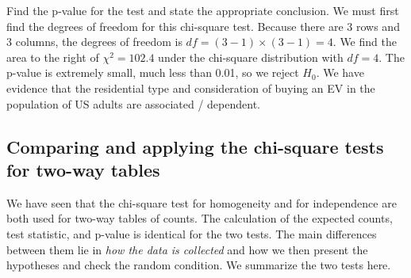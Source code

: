 \begin{examplewrap}
\begin{nexample}{Find the p-value for the test and state the appropriate conclusion.}
We must first find the degrees of freedom for this chi-square test.  Because there are 3 rows and 3 columns, the degrees of freedom is $df=(3-1)\times (3-1) = 4$. We find the area to the right of $\chi^2=102.4$ under the chi-square distribution with $df=4$.  The p-value is extremely small, much less than 0.01, so we reject $H_0$.  We have evidence that the residential type and consideration of buying an EV in the population of US adults are associated / dependent.  
\end{nexample}
\end{examplewrap}




\newpage
\subsection{Comparing and applying the chi-square tests for two-way tables}

We have seen that the chi-square test for homogeneity and for independence are both used for two-way tables of counts.  The calculation of the expected counts, test statistic, and p-value is identical for the two tests.  The main differences between them lie in \emph{how the data is collected} and how we then present the hypotheses and check the random condition.  We summarize the two tests here.

